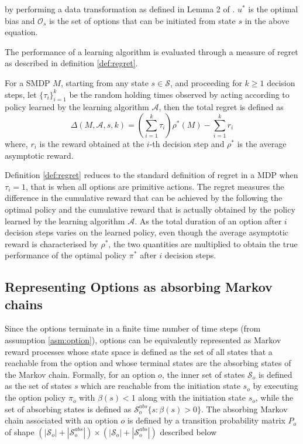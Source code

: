 by performing a data transformation as defined in Lemma 2 of \cite{federgruen_denumerable_1983}. $u^*$ is the optimal bias and $\mathcal{O}_s$ is the set of options that can be initiated from state $s$ in the above equation.

The performance of a learning algorithm is evaluated through a measure of regret as described in definition \ref{def:regret}.

\begin{definition}
\label{def:regret}
For a SMDP $M$, starting from any state $s \in \mathcal{S}$, and proceeding for $k \ge 1$ decision steps, let $\{\tau_i\}_{i=1}^k$ be the random holding times observed by acting according to policy learned by the learning algorithm $\mathcal{A}$, then the total regret is defined as
\begin{equation}
    \Delta(M, \mathcal{A}, s, k) = \left( \sum_{i=1}^k \tau_i \right) \rho^*(M) - \sum_{i=1}^k r_i
\end{equation}
where, $r_i$ is the reward obtained at the $i$-th decision step and $\rho^*$ is the average asymptotic reward.
\end{definition}

Definition \ref{def:regret} reduces to the standard definition of regret in a MDP when $\tau_i = 1$, that is when all options are primitive actions.
The regret measures the difference in the cumulative reward that can be achieved by the following the optimal policy and the cumulative reward that is actually obtained by the policy learned by the learning algorithm $\mathcal{A}$.
As the total duration of an option after $i$ decision steps varies on the learned policy, even though the average asymptotic reward is characterised by $\rho^*$, the two quantities are multiplied to obtain the true performance of the optimal policy $\pi^*$ after $i$ decision steps.

\subsection{Representing Options as absorbing Markov chains} \label{sec:trueP0}

Since the options terminate in a finite time number of time steps (from assumption \ref{asm:option}), options can be equivalently represented as Markov reward processes whose state space is defined as the set of all states that a reachable from the option and whose terminal states are the absorbing states of the Markov chain.
Formally, for an option $o$, the inner set of states $\mathcal{S}_o$ is defined as the set of states $s$ which are reachable from the initiation state $s_o$ by executing the option policy $\pi_o$ with $\beta(s) < 1$ along with the initiation state $s_o$, while the set of absorbing states is defined as $\mathcal{S}_o^{abs}\{s : \beta(s) > 0\}$.
The absorbing Markov chain associated with an option $o$ is defined by a transition probability matrix $P_o$ of shape $(|\mathcal{S}_o| + |\mathcal{S}_o^{abs}|) \times (|\mathcal{S}_o| + |\mathcal{S}_o^{abs}|)$ described below

